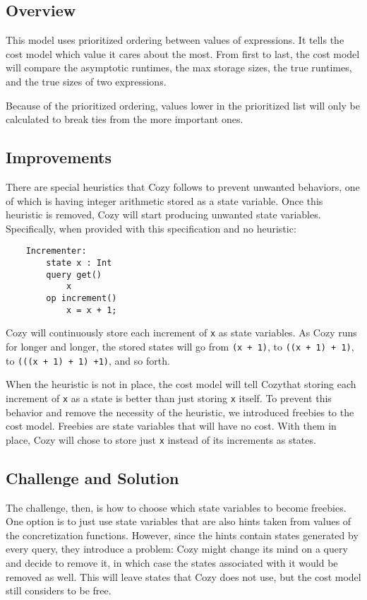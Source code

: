 \newcommand{\code}[1]{\texttt{#1}}

\subsection{Overview}
This model uses prioritized ordering between values of expressions. It tells the
cost model which value it cares about the most. From first to last, the cost
model will compare the asymptotic runtimes, the max storage sizes, the true
runtimes, and the true sizes of two expressions.

Because of the prioritized ordering, values lower in the prioritized list will
only be calculated to break ties from the more important ones.

\subsection{Improvements}
There are special heuristics that Cozy follows to prevent unwanted behaviors,
one of which is having integer arithmetic stored as a state variable. Once this
heuristic is removed, Cozy will start producing unwanted state variables.
Specifically, when provided with this specification and no heuristic:

\begin{center}
\begin{lstlisting}
    Incrementer:
        state x : Int
        query get()
            x
        op increment()
            x = x + 1;
\end{lstlisting}
\end{center}

Cozy will continuously store each increment of \code{x} as state variables. As
Cozy runs for longer and longer, the stored states will go from \code{(x + 1)},
to \code{((x + 1) + 1)}, to \code{(((x + 1) + 1) +1)}, and so forth.

When the heuristic is not in place, the cost model will tell Cozythat storing
each increment of \code{x} as a state is better than just storing \code{x}
itself. To prevent this behavior and remove the necessity of the heuristic, we
introduced freebies to the cost model. Freebies are state variables that will
have no cost. With them in place, Cozy will chose to store just \code{x} instead
of its increments as states.

\subsection{Challenge and Solution}
The challenge, then, is how to choose which state variables to become freebies.
One option is to just use state variables that are also hints taken from values
of the concretization functions. However, since the hints contain states
generated by every query, they introduce a problem: Cozy might change its mind
on a query and decide to remove it, in which case the states associated with it
would be removed as well. This will leave states that Cozy does not use, but the
cost model still considers to be free.

